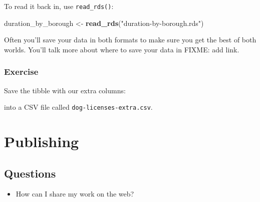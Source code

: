 \documentclass[]{Nemilov}
\newenvironment{Shaded}{\begin{snugshade}}{\end{snugshade}}
\newcommand{\DataTypeTok}[1]{\textcolor[rgb]{0.13,0.29,0.53}{#1}}
\newcommand{\DecValTok}[1]{\textcolor[rgb]{0.00,0.00,0.81}{#1}}
\newcommand{\KeywordTok}[1]{\textcolor[rgb]{0.13,0.29,0.53}{\textbf{#1}}}
\newcommand{\NormalTok}[1]{#1}
\newcommand{\OperatorTok}[1]{\textcolor[rgb]{0.81,0.36,0.00}{\textbf{#1}}}
\newcommand{\StringTok}[1]{\textcolor[rgb]{0.31,0.60,0.02}{#1}}
\providecommand{\tightlist}{%
  \setlength{\itemsep}{0pt}\setlength{\parskip}{0pt}}
\begin{document}
To read it back in, use \texttt{read\_rds()}:

\begin{Shaded}
\begin{Highlighting}[]
\NormalTok{duration_by_borough <-}\StringTok{ }\KeywordTok{read_rds}\NormalTok{(}\StringTok{"duration-by-borough.rds"}\NormalTok{)}
\end{Highlighting}
\end{Shaded}

Often you'll save your data in both formats to make sure you get the best of both worlds. You'll talk more about where to save your data in FIXME: add link.

\hypertarget{exercise}{%
\subsection{Exercise}\label{exercise}}

Save the tibble with our extra columns:

\begin{Shaded}
\end{Shaded}

into a CSV file called \texttt{dog-licenses-extra.csv}.

\hypertarget{r-publishing}{%
\chapter{Publishing}\label{r-publishing}}

\hypertarget{r-publishing-questions}{%
\section{Questions}\label{r-publishing-questions}}

\begin{itemize}
\tightlist
\item
  How can I share my work on the web?
\end{itemize}
\end{document}
